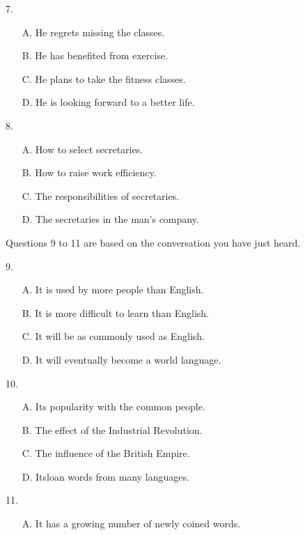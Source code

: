\documentclass[UTF8,11pt]{ctexart}
\begin{document}
7.


\begin{itemize}[leftmargin=2em,itemsep=.2em,topsep=.4em]\item[A.] He regrets missing the classes.
\item[B.] He has benefited from exercise.
\item[C.] He plans to take the fitness classes.
\item[D.] He is looking forward to a better life.
\end{itemize}

8.


\begin{itemize}[leftmargin=2em,itemsep=.2em,topsep=.4em]\item[A.] How to select secretaries.
\item[B.] How to raise work efficiency.
\item[C.] The responsibilities of secretaries.
\item[D.] The secretaries in the man’s company.
\end{itemize}

Questions 9 to 11 are based on the conversation you have just heard.


9.


\begin{itemize}[leftmargin=2em,itemsep=.2em,topsep=.4em]\item[A.] It is used by more people than English.
\item[B.] It is more difficult to learn than English.
\item[C.] It will be as commonly used as English.
\item[D.] It will eventually become a world language.
\end{itemize}

10.


\begin{itemize}[leftmargin=2em,itemsep=.2em,topsep=.4em]\item[A.] Its popularity with the common people.
\item[B.] The effect of the Industrial Revolution.
\item[C.] The influence of the British Empire.
\item[D.] Itsloan words from many languages.
\end{itemize}

11.


\begin{itemize}[leftmargin=2em,itemsep=.2em,topsep=.4em]\item[A.] It has a growing number of newly coined words.
\end{itemize}
\end{document}
